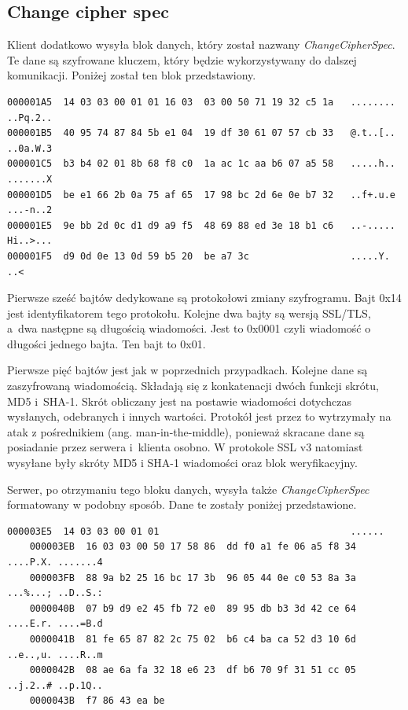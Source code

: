 \documentclass[12pt,twoside,a4]{mwbk}
\theoremstyle{definition}
\begin{document}
\subsection{Change cipher spec}
Klient dodatkowo wysyła blok danych, który został nazwany \textit{ChangeCipherSpec}. Te dane są szyfrowane kluczem, który będzie wykorzystywany do dalszej komunikacji. Poniżej został ten blok przedstawiony.
\begin{lstlisting}[keywordstyle=\color{Black},
  commentstyle=\color{Black},
  stringstyle=\color{Black},
  identifierstyle=\color{Black}]
000001A5  14 03 03 00 01 01 16 03  03 00 50 71 19 32 c5 1a   ........ ..Pq.2..
000001B5  40 95 74 87 84 5b e1 04  19 df 30 61 07 57 cb 33   @.t..[.. ..0a.W.3
000001C5  b3 b4 02 01 8b 68 f8 c0  1a ac 1c aa b6 07 a5 58   .....h.. .......X
000001D5  be e1 66 2b 0a 75 af 65  17 98 bc 2d 6e 0e b7 32   ..f+.u.e ...-n..2
000001E5  9e bb 2d 0c d1 d9 a9 f5  48 69 88 ed 3e 18 b1 c6   ..-..... Hi..>...
000001F5  d9 0d 0e 13 0d 59 b5 20  be a7 3c                  .....Y.  ..<
\end{lstlisting}

Pierwsze sześć bajtów dedykowane są protokołowi zmiany szyfrogramu. Bajt 0x14 jest identyfikatorem tego protokołu. Kolejne dwa bajty są wersją SSL/TLS, a~dwa następne są długością wiadomości. Jest to 0x0001 czyli wiadomość o długości jednego bajta. Ten bajt to 0x01. \\ \par

Pierwsze pięć bajtów jest jak w poprzednich przypadkach. Kolejne dane są zaszyfrowaną wiadomością. Składają się z konkatenacji dwóch funkcji skrótu, MD5 i~SHA-1. Skrót obliczany jest na postawie wiadomości dotychczas wysłanych, odebranych i innych wartości. Protokół jest przez to wytrzymały na atak z pośrednikiem (ang. man-in-the-middle), ponieważ skracane dane są posiadanie przez serwera i~klienta osobno. W protokole SSL v3 natomiast wysyłane były skróty MD5 i SHA-1 wiadomości oraz blok weryfikacyjny. \\ \par

Serwer, po otrzymaniu tego bloku danych, wysyła także \textit{ChangeCipherSpec} formatowany w podobny sposób. Dane te zostały poniżej przedstawione.
\begin{lstlisting}[keywordstyle=\color{Black},
  commentstyle=\color{Black},
  stringstyle=\color{Black},
  identifierstyle=\color{Black}]
    000003E5  14 03 03 00 01 01                                  ......
    000003EB  16 03 03 00 50 17 58 86  dd f0 a1 fe 06 a5 f8 34   ....P.X. .......4
    000003FB  88 9a b2 25 16 bc 17 3b  96 05 44 0e c0 53 8a 3a   ...%...; ..D..S.:
    0000040B  07 b9 d9 e2 45 fb 72 e0  89 95 db b3 3d 42 ce 64   ....E.r. ....=B.d
    0000041B  81 fe 65 87 82 2c 75 02  b6 c4 ba ca 52 d3 10 6d   ..e..,u. ....R..m
    0000042B  08 ae 6a fa 32 18 e6 23  df b6 70 9f 31 51 cc 05   ..j.2..# ..p.1Q..
    0000043B  f7 86 43 ea be 
\end{lstlisting}
\end{document}

